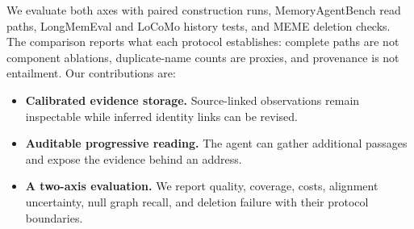 We evaluate both axes with paired construction runs, MemoryAgentBench read paths, LongMemEval and LoCoMo history tests, and MEME deletion checks. The comparison reports what each protocol establishes: complete paths are not component ablations, duplicate-name counts are proxies, and provenance is not entailment. Our contributions are:
\begin{itemize}
    \item \textbf{Calibrated evidence storage.} Source-linked observations remain inspectable while inferred identity links can be revised.
    \item \textbf{Auditable progressive reading.} The agent can gather additional passages and expose the evidence behind an address.
    \item \textbf{A two-axis evaluation.} We report quality, coverage, costs, alignment uncertainty, null graph recall, and deletion failure with their protocol boundaries.
\end{itemize}
